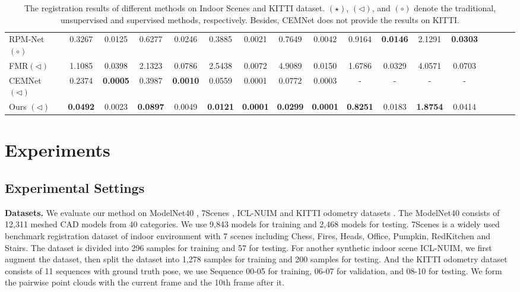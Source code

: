 \documentclass[letterpaper]{article} %
\begin{document}
\begin{table}
\begin{center}
{{\begin{tabular}{lcccc|cccc|cccccccc}
						RPM-Net $\left(\circ\right)$ &0.3267 & 0.0125& 0.6277 &0.0246&0.3885 &0.0021 & 0.7649 &0.0042&0.9164 &\textbf{0.0146} &2.1291 &\textbf{0.0303}\\
						FMR$\left(\triangleleft\right)$ & 1.1085& 0.0398&2.1323&0.0786& 2.5438&0.0072&4.9089&0.0150& 1.6786&0.0329 &4.0571 & 0.0703\\
						CEMNet $\left(\triangleleft\right)$ &0.2374&\textbf{0.0005}& 0.3987 & \textbf{0.0010} &0.0559&0.0001&0.0772&0.0003&-&-&-&-\\ %
						\midrule
						Ours $\left(\triangleleft\right)$ &\textbf{0.0492}& 0.0023&\textbf{0.0897}& 0.0049& \textbf{0.0121}& \textbf{0.0001}& \textbf{0.0299}& \textbf{0.0001}& \textbf{0.8251}& 0.0183& \textbf{1.8754}& 0.0414\\
						\bottomrule
				\end{tabular}}
			}
		\end{center}
		\caption{The registration results of different methods on Indoor Scenes and KITTI dataset. $\left(\star\right)$, $\left(\triangleleft\right)$, and $\left(\circ\right)$ denote the traditional, unsupervised and supervised methods, respectively. Besides, CEMNet does not provide the results on KITTI.}
		\label{table9}
		\vskip -5pt
	\end{table}

	\section{Experiments}
	\subsection{Experimental Settings}
	\noindent \textbf{Datasets.} We evaluate our method on ModelNet40 \cite{wu20153d}, 7Scenes \cite{shotton2013scene}, ICL-NUIM \cite{choi2015robust} and KITTI odometry datasets \cite{geiger2012we}. The ModelNet40 consists of 12,311 meshed CAD models from 40 categories. We use 9,843 models for training and 2,468 models for testing. 7Scenes is a widely used benchmark registration dataset of indoor environment with 7 scenes including Chess, Fires, Heads, Office, Pumpkin, RedKitchen and Stairs.
	The dataset is divided into 296 samples for training and 57 for testing.
	For another synthetic indoor scene ICL-NUIM, we first augment the dataset, then split the dataset into 1,278 samples for training and 200 samples for testing. And the KITTI odometry dataset consists of 11 sequences with ground truth pose, we use Sequence 00-05 for training, 06-07 for validation, and 08-10 for testing. We form the pairwise point clouds with the current frame and the 10th frame after it.
\end{document}
